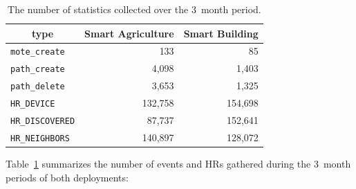 \documentclass{elsarticle}
\newcommand{\building}            {Smart Building\xspace}
\newcommand{\agri}                {Smart Agriculture\xspace}
\newcommand{\HRNEIGHBORS}         {{\tt HR\_NEIGHBORS}\xspace}
\newcommand{\HRDISCOVERED}        {{\tt HR\_DISCOVERED}\xspace}
\newcommand{\HRDEVICE}            {{\tt HR\_DEVICE}\xspace}
\newcommand{\pathcreate}          {{\tt path\_create}\xspace}
\newcommand{\pathdelete}          {{\tt path\_delete}\xspace}
\newcommand{\motecreate}          {{\tt mote\_create}\xspace}
\newcommand{\PEACHNUMHRNEIGHBORS} {140,897\xspace}
\newcommand{\EVANUMHRNEIGHBORS}   {128,072\xspace}
\begin{document}

\begin{table}
    \centering
    \begin{tabular}{|l|r|r|}
        \toprule
        \multicolumn{1}{|c|}{type} & \multicolumn{1}{|c|}{\agri} & \multicolumn{1}{|c|}{\building} \\ \hline
        \hline
        \motecreate                &                         133 &                              85 \\ \hline
        \pathcreate                &                       4,098 &                           1,403 \\ \hline
        \pathdelete                &                       3,653 &                           1,325 \\ \hline
        \HRDEVICE                  &                     132,758 &                         154,698 \\ \hline
        \HRDISCOVERED              &                      87,737 &                         152,641 \\ \hline
        \HRNEIGHBORS               &        \PEACHNUMHRNEIGHBORS &              \EVANUMHRNEIGHBORS \\ \hline
    \end{tabular}
    \caption{The number of statistics collected over the 3~month period.}
    \label{tab:msg_stats}
\end{table}

Table~\ref{tab:msg_stats} summarizes the number of events and HRs gathered during the 3~month periods of both deployments:
\end{document}
